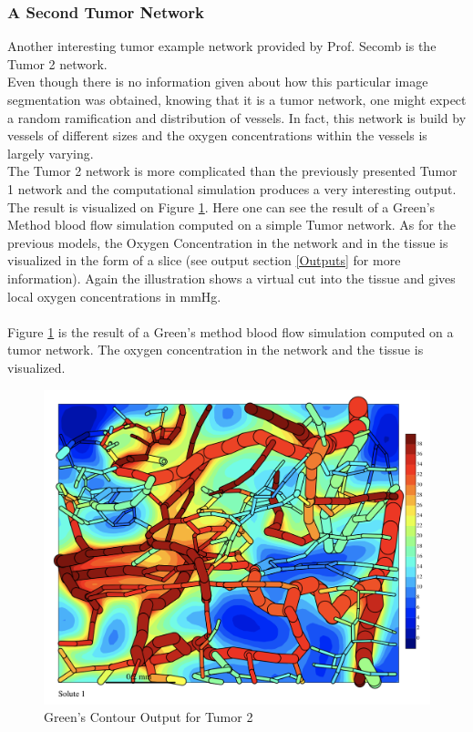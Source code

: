 \newpage
\subsubsection*{A Second Tumor Network}
\label{Tumor}

Another interesting tumor example network provided by Prof. Secomb is the Tumor 2 network.
\\Even though there is no information given about how this particular image segmentation was obtained, knowing that it is a tumor network, one might expect a random ramification and distribution of vessels. In fact, this network is build by vessels of different sizes and the oxygen concentrations within the vessels is largely varying.
\\The Tumor 2 network is more complicated than the previously presented Tumor 1 network and the computational simulation produces a very interesting output. The result is visualized on Figure \ref{fig:Contour_TumorDuke}. Here one can see the result of a Green's Method blood flow simulation computed on a simple Tumor network. As for the previous models, the Oxygen Concentration in the network and in the tissue is visualized in the form of a slice (see output section \ref{Outputs} for more information). Again the illustration shows a virtual cut into the tissue and gives local oxygen concentrations in mmHg.\\\\
Figure \ref{fig:Contour_TumorDuke}  is the result of a Green's method blood flow simulation computed on a tumor network. The oxygen concentration in the network and the tissue is visualized.\\
\begin{figure}[h]
\centering
\includegraphics[width=120mm]{Contour_TumorDuke}
\caption{\footnotesize Green's Contour Output for Tumor 2}
\label{fig:Contour_TumorDuke}
\end{figure}\\
